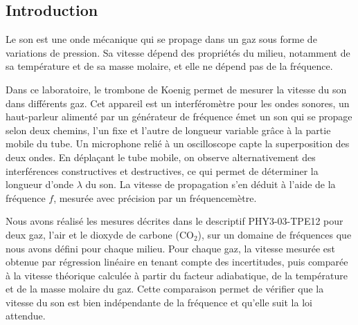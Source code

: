 \subsection{Introduction}

Le son est une onde mécanique qui se propage dans un gaz sous forme de variations de pression. Sa vitesse dépend des propriétés du milieu, notamment de sa température et de sa masse molaire, et elle ne dépend pas de la fréquence.

Dans ce laboratoire, le trombone de Koenig permet de mesurer la vitesse du son dans différents gaz. Cet appareil est un interféromètre pour les ondes sonores, un haut-parleur alimenté par un générateur de fréquence émet un son qui se propage selon deux chemins, l'un fixe et l'autre de longueur variable grâce à la partie mobile du tube. Un microphone relié à un oscilloscope capte la superposition des deux ondes. En déplaçant le tube mobile, on observe alternativement des interférences constructives et destructives, ce qui permet de déterminer la longueur d'onde $\lambda$ du son. La vitesse de propagation s'en déduit à l'aide de la fréquence $f$, mesurée avec précision par un fréquencemètre.

Nous avons réalisé les mesures décrites dans le descriptif PHY3-03-TPE12  pour deux gaz, l'air et le dioxyde de carbone (CO$_2$), sur un domaine de fréquences que nous avons défini pour chaque milieu. Pour chaque gaz, la vitesse mesurée est obtenue par régression linéaire en tenant compte des incertitudes, puis comparée à la vitesse théorique calculée à partir du facteur adiabatique, de la température et de la masse molaire du gaz. Cette comparaison permet de vérifier que la vitesse du son est bien indépendante de la fréquence et qu'elle suit la loi attendue.